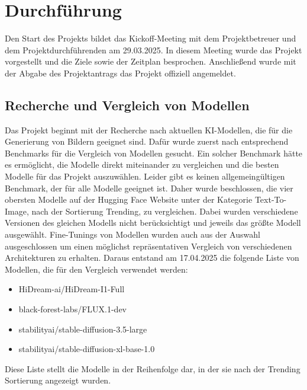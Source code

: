 	\noindent %


\section{Durchführung}
Den Start des Projekts bildet das Kickoff-Meeting mit dem Projektbetreuer und dem Projektdurchführenden am 29.03.2025.
In diesem Meeting wurde das Projekt vorgestellt und die Ziele sowie der Zeitplan besprochen. Anschließend wurde mit der Abgabe des Projektantrags das Projekt offiziell angemeldet.
\subsection{Recherche und Vergleich von Modellen}
Das Projekt beginnt mit der Recherche nach aktuellen KI-Modellen, die für die Generierung von Bildern geeignet sind. Dafür wurde zuerst nach entsprechend Benchmarks für die Vergleich von Modellen gesucht. Ein solcher Benchmark hätte es ermöglicht, die Modelle direkt miteinander zu vergleichen und die besten Modelle für das Projekt auszuwählen. Leider gibt es keinen allgemeingültigen Benchmark, der für alle Modelle geeignet ist. Daher wurde beschlossen, die vier obersten Modelle auf der Hugging Face Website unter der Kategorie Text-To-Image, nach der Sortierung Trending, zu vergleichen. Dabei wurden verschiedene Versionen des gleichen Modells nicht berücksichtigt und jeweils das größte Modell ausgewählt. Fine-Tunings von Modellen wurden auch aus der Auswahl ausgeschlossen um einen möglichst repräsentativen Vergleich von verschiedenen Architekturen zu erhalten. Daraus entstand am 17.04.2025 die folgende Liste von Modellen, die für den Vergleich verwendet werden:
\begin{itemize}
    \item HiDream-ai/HiDream-I1-Full
    \item black-forest-labs/FLUX.1-dev
    \item stabilityai/stable-diffusion-3.5-large
    \item stabilityai/stable-diffusion-xl-base-1.0
\end{itemize}
Diese Liste stellt die Modelle in der Reihenfolge dar, in der sie nach der Trending Sortierung angezeigt wurden.
